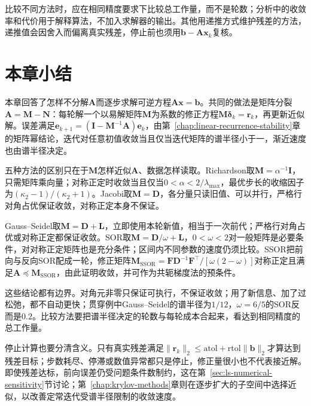 比较不同方法时，应在相同精度要求下比较总工作量，而不是轮数；分析中的收敛率和代价用于解释算法，不加入求解器的输出。其他用递推方式维护残差的方法，递推值会因舍入而偏离真实残差，停止前也须用$\bm b-\bm A\bm x_k$复核。

\FloatBarrier
\section{本章小结}
\label{sec:stationary-iterations-summary}

本章回答了怎样不分解$\bm A$而逐步求解可逆方程$\bm A\bm x=\bm b$。共同的做法是矩阵分裂$\bm A=\bm M-\bm N$：每轮解一个以易解矩阵$\bm M$为系数的修正方程$\bm M\bm\delta_k=\bm r_k$，再更新近似解。误差满足$\bm e_{k+1}=(\bm I-\bm M^{-1}\bm A)\bm e_k$，由第~\ref{chap:linear-recurrence-stability}章的矩阵幂结论，迭代对任意初值收敛当且仅当迭代矩阵的谱半径小于一，渐近速度也由谱半径决定。

五种方法的区别只在于$\bm M$怎样近似$\bm A$、数据怎样读取。Richardson取$\bm M=\alpha^{-1}\bm I$，只需矩阵乘向量；对称正定时收敛当且仅当$0<\alpha<2/\lambda_{\max}$，最优步长的收缩因子为$(\kappa_2-1)/(\kappa_2+1)$。Jacobi取$\bm M=\bm D$，各分量只读旧值、可以并行，严格行对角占优保证收敛，对称正定本身不保证。

Gauss--Seidel取$\bm M=\bm D+\bm L$，立即使用本轮新值，相当于一次前代；严格行对角占优或对称正定都保证收敛。SOR取$\bm M=\bm D/\omega+\bm L$，$0<\omega<2$对一般矩阵是必要条件，对对称正定矩阵也是充分条件；区间内不同参数的速度仍须比较。SSOR把前向与反向SOR配成一轮，修正矩阵$\bm M_{\mathrm{SSOR}}=\bm F\bm D^{-1}\bm F^\top/[\omega(2-\omega)]$对称正定且满足$\bm A\preceq\bm M_{\mathrm{SSOR}}$，由此证明收敛，并可作为共轭梯度法的预条件。

这些结论都有边界。对角元非零只保证可执行，不保证收敛；用了新信息、加了过松弛，都不自动更快；贯穿例中Gauss--Seidel的谱半径为$1/12$，$\omega=6/5$的SOR反而是$0.2$。比较方法要把谱半径决定的轮数与每轮成本合起来，看达到相同精度的总工作量。

停止计算也要分清含义。只有真实残差满足$\lVert\bm r_k\rVert_2\leq\mathrm{atol}+\mathrm{rtol}\lVert\bm b\rVert_2$才算达到残差目标；步数耗尽、停滞或数值异常都只是停止，修正量很小也不代表接近解。即使残差达标，前向误差仍受问题条件数制约，这在第~\ref{sec:ls-numerical-sensitivity}节讨论；第~\ref{chap:krylov-methods}章则在逐步扩大的子空间中选择近似，以改善定常迭代受谱半径限制的收敛速度。
